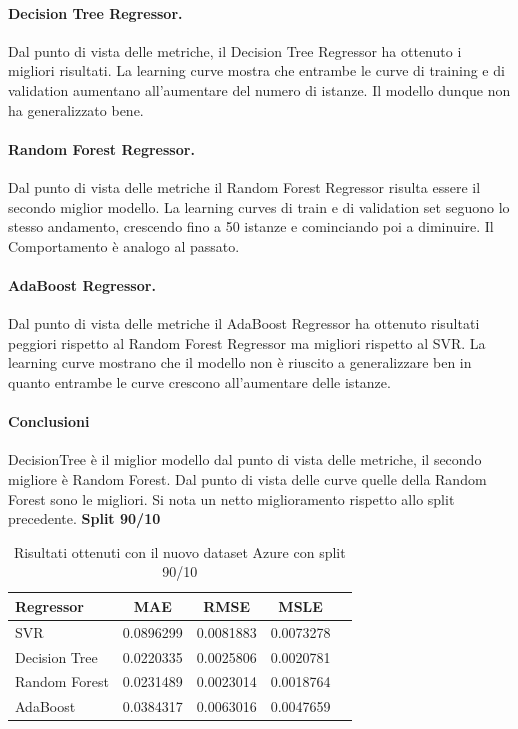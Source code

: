 \paragraph{\textbf{Decision Tree Regressor}.}
Dal punto di vista delle metriche, il Decision Tree Regressor ha ottenuto i migliori risultati.
La learning curve mostra che entrambe le curve di training e di validation aumentano all'aumentare del numero di istanze. Il modello dunque non ha generalizzato bene.
\paragraph{\textbf{Random Forest Regressor}.}
Dal punto di vista delle metriche il Random Forest Regressor risulta essere il secondo miglior modello.
La learning curves di train e di validation set seguono lo stesso andamento, crescendo fino a 50 istanze e cominciando poi a diminuire. Il Comportamento è analogo al passato.
\paragraph{\textbf{AdaBoost Regressor}.}
Dal punto di vista delle metriche il AdaBoost Regressor ha ottenuto risultati peggiori rispetto al Random Forest Regressor ma migliori rispetto al SVR.
La learning curve mostrano che il modello non è riuscito a generalizzare ben in quanto entrambe le curve crescono all'aumentare delle istanze.

\paragraph{\textbf{Conclusioni}} DecisionTree è il miglior modello dal punto di vista delle metriche, il secondo migliore è Random Forest. Dal punto di vista delle curve quelle della Random Forest sono le migliori. Si nota un netto miglioramento rispetto allo split precedente.
\newpage
\noindent\textbf{Split 90/10}

\begin{table}[H]
    \centering
    \begin{tabular}{|>{\centering\arraybackslash}m{5cm}|c|c|c|c|}
        \hline
        \textbf{Regressor} & \textbf{MAE} & \textbf{RMSE} & \textbf{MSLE} \\ [10pt]
        \hline
        SVR & 0.0896299 & 0.0081883 & 0.0073278 \\ [10pt]
        \hline
        Decision Tree & 0.0220335 & 0.0025806 & 0.0020781 \\ [10pt]
        \hline
        Random Forest & 0.0231489 & 0.0023014 & 0.0018764 \\ [10pt]
        \hline
        AdaBoost & 0.0384317 & 0.0063016 & 0.0047659 \\ [10pt]
        \hline
    \end{tabular}
    \caption{Risultati ottenuti con il nuovo dataset Azure con split 90/10}
    \label{tab:results}
\end{table}

